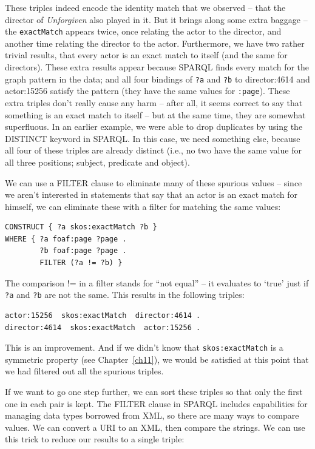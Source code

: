 \begin{challenge}
These triples indeed encode the identity match that we observed -- that
the director of \emph{Unforgiven} also played in it. But it brings along
some extra baggage -- the \texttt{exactMatch} appears twice, once relating the
actor to the director, and another time relating the director to the
actor. Furthermore, we have two rather trivial results, that every actor
is an exact match to itself (and the same for directors). These extra
results appear because SPARQL finds every match for the graph pattern in
the data; and all four bindings of \texttt{?a} and \texttt{?b} to director:4614 and
actor:15256 satisfy the pattern (they have the same values for \texttt{:page}).
These extra triples don't really cause any harm -- after all, it seems
correct to say that something is an exact match to itself -- but at the
same time, they are somewhat superfluous. In an earlier example, we were
able to drop duplicates by using the DISTINCT keyword in SPARQL. In this
case, we need something else, because  all four of these triples are
already distinct (i.e., no two have the same value for all three
positions; subject, predicate and object).

We can use a FILTER clause to eliminate many of these spurious values --
since we aren't interested in statements that say that an actor is an
exact match for himself, we can eliminate these with a filter for
matching the same values:

\begin{lstlisting}
CONSTRUCT { ?a skos:exactMatch ?b }
WHERE { ?a foaf:page ?page . 
        ?b foaf:page ?page .
        FILTER (?a != ?b) }
\end{lstlisting}

The comparison != in a filter stands for ``not equal'' -- it evaluates
to `true' just if \texttt{?a} and \texttt{?b} are not the same. This results in the
following triples:

\begin{lstlisting}
actor:15256  skos:exactMatch  director:4614 .
director:4614  skos:exactMatch  actor:15256 .
\end{lstlisting}

This is an improvement. And if we didn't know that \texttt{skos:exactMatch} is a
symmetric property (see Chapter~\ref{ch11}), we would be satisfied at this point that we had filtered out all
the spurious triples.

If we want to go one step further, we can sort these triples so that
only the first one in each pair is kept. The FILTER clause in SPARQL
includes capabilities for managing data types borrowed from XML, so
there are many ways to compare values. We can convert a URI to an XML,
then compare the strings. We can use this trick to reduce our results to
a single triple:


\end{challenge}
